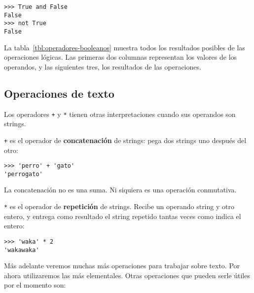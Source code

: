 \begin{lstlisting}
>>> True and False
False
>>> not True
False
\end{lstlisting}

La tabla~\ref{tbl:operadores-booleanos} muestra todos los resultados posibles de las
operaciones lógicas. Las primeras dos columnas representan los valores
de los operandos, y las siguientes tres, los resultados de las
operaciones.

\subsection{Operaciones de texto}

Los operadores \lstinline!+! y \lstinline!*! tienen otras
interpretaciones cuando sus operandos son strings.

\lstinline!+! es el operador de \textbf{concatenación} de strings: pega
dos strings uno después del otro:

\begin{lstlisting}
>>> 'perro' + 'gato'
'perrogato'
\end{lstlisting}

La concatenación no es una suma. Ni siquiera es una operación
conmutativa.

\lstinline!*! es el operador de \textbf{repetición} de strings. Recibe
un operando string y otro entero, y entrega como resultado el string
repetido tantas veces como indica el entero:

\begin{lstlisting}
>>> 'waka' * 2
'wakawaka'
\end{lstlisting}

Más adelante veremos muchas más operaciones para trabajar sobre texto.
Por ahora utilizaremos las más elementales. Otras operaciones que pueden
serle útiles por el momento son:

